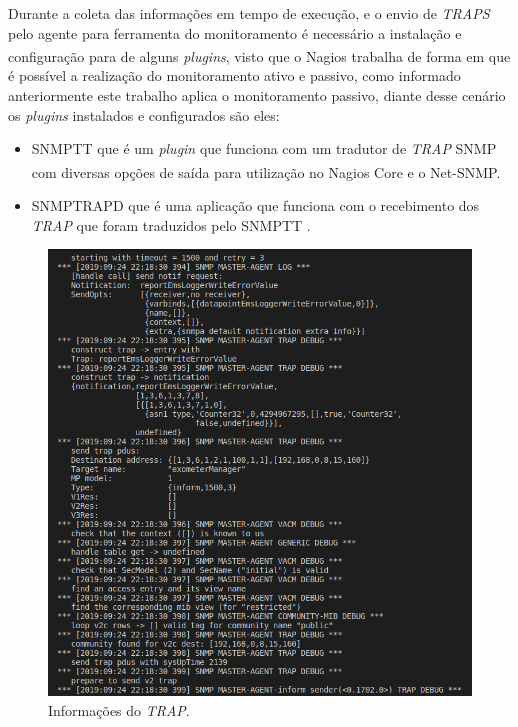 Durante a coleta das informações em tempo de execução, e o envio de \textit{TRAPS} pelo agente para ferramenta do monitoramento é necessário a instalação e configuração para de alguns \textit{plugins}, visto que o Nagios\textsuperscript{\textregistered} trabalha de forma em que é possível a realização do monitoramento ativo e passivo, como informado anteriormente este trabalho aplica o monitoramento passivo, diante desse cenário os \textit{plugins} instalados e configurados são eles:
\begin{itemize}
\item \acrfull{SNMPTT} que é um \textit{plugin} que funciona com um tradutor de \textit{TRAP} \acrshort{SNMP} com diversas opções de saída para utilização no Nagios Core\textsuperscript{\textregistered} e o Net-SNMP\cite{nagiosCoreSNMPTT}.
\item SNMPTRAPD que é uma aplicação que funciona com o recebimento dos \textit{TRAP} que foram traduzidos pelo \acrshort{SNMPTT} \cite{net_snmptrapd}.
\end{itemize}

\begin{figure}[h!]
	\begin{center}
	\includegraphics[scale = 0.75]{img/debugTrap.png}
	\caption{Informações do \textit{TRAP}.}
	\label{fun:fig:debugTrap}
	\end{center}
\end{figure}

